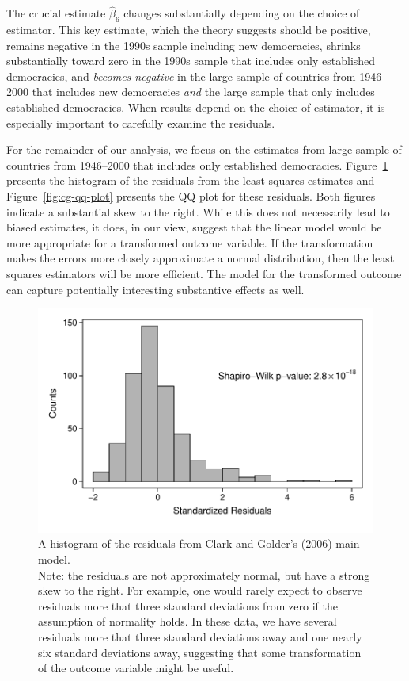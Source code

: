 \documentclass[12pt]{article}
\begin{document}
The crucial estimate $\hat{\beta}_6$ changes substantially depending on the choice of estimator. 
This key estimate, which the theory suggests should be positive, remains negative in the 1990s sample including new democracies, shrinks substantially toward zero in the 1990s sample that includes only established democracies, and \textit{becomes negative} in the large sample of countries from 1946--2000 that includes new democracies \textit{and} the large sample that only includes established democracies. 
When results depend on the choice of estimator, it is especially important to carefully examine the residuals.

For the remainder of our analysis, we focus on the estimates from large sample of countries from 1946--2000 that includes only established democracies. 
Figure~\ref{fig:cg-residuals-hist} presents the histogram of the residuals from the least-squares estimates and Figure~\ref{fig:cg-qq-plot} presents the QQ plot for these residuals. 
Both figures indicate a substantial skew to the right. 
While this does not necessarily lead to biased estimates, it does, in our view, suggest that the linear model would be more appropriate for a transformed outcome variable. 
If the transformation makes the errors more closely approximate a normal distribution, then the least squares estimators will be more efficient. 
The model for the transformed outcome can capture potentially interesting substantive effects as well.

\begin{figure}[h!]
\begin{center}
\includegraphics[scale = 0.6]{figs/cg-residuals-hist.pdf}
\caption{A histogram of the residuals from Clark and Golder's (2006) main model.\\
Note: the residuals are not approximately normal, but have a strong skew to the right. 
For example, one would rarely expect to observe residuals more that three standard deviations from zero if the assumption of normality holds. 
In these data, we have several residuals more that three standard deviations away and one nearly six standard deviations away, suggesting that some transformation of the outcome variable might be useful.}\label{fig:cg-residuals-hist}	
\end{center}
\end{figure}
\end{document}

